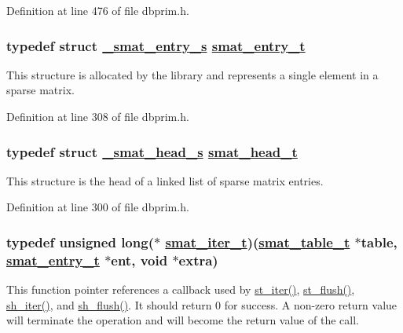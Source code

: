 Definition at line 476 of file dbprim.h.\hypertarget{group__dbprim__smat_ga2}{
\subsubsection[smat\_\-entry\_\-t]{\setlength{\rightskip}{0pt plus 5cm}typedef struct \hyperlink{struct__smat__entry__s}{\_\-smat\_\-entry\_\-s} \hyperlink{struct__smat__entry__s}{smat\_\-entry\_\-t}}}
\label{group__dbprim__smat_ga2}


This structure is allocated by the library and represents a single element in a sparse matrix.

Definition at line 308 of file dbprim.h.\hypertarget{group__dbprim__smat_ga1}{
\subsubsection[smat\_\-head\_\-t]{\setlength{\rightskip}{0pt plus 5cm}typedef struct \hyperlink{struct__smat__head__s}{\_\-smat\_\-head\_\-s} \hyperlink{struct__smat__head__s}{smat\_\-head\_\-t}}}
\label{group__dbprim__smat_ga1}


This structure is the head of a linked list of sparse matrix entries.

Definition at line 300 of file dbprim.h.\hypertarget{group__dbprim__smat_ga4}{
\subsubsection[smat\_\-iter\_\-t]{\setlength{\rightskip}{0pt plus 5cm}typedef unsigned long($\ast$ \hyperlink{group__dbprim__smat_ga4}{smat\_\-iter\_\-t})(\hyperlink{struct__smat__table__s}{smat\_\-table\_\-t} $\ast$table, \hyperlink{struct__smat__entry__s}{smat\_\-entry\_\-t} $\ast$ent, void $\ast$extra)}}
\label{group__dbprim__smat_ga4}


This function pointer references a callback used by \hyperlink{group__dbprim__smat_ga14}{st\_\-iter()}, \hyperlink{group__dbprim__smat_ga15}{st\_\-flush()}, \hyperlink{group__dbprim__smat_ga21}{sh\_\-iter()}, and \hyperlink{group__dbprim__smat_ga22}{sh\_\-flush()}. It should return 0 for success. A non-zero return value will terminate the operation and will become the return value of the call.

